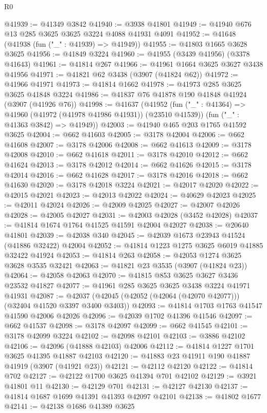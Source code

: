 \begin{lexlean}{R0}
\begin{coremodule}
@41939 := @41349 @3842
@41940 := @3938 @41801
@41949 := @41940 @676 @13 @285 @3625 @3625 @3224 @4088 @41931 @4091
@41952 := @41648 (@41938 (fun ("_" : @41939) => @41949))
@41955 := @41803 @1665 @3628 @3625
@41956 := @41849 @3224
@41960 := @41955 (@3439 @41956) (@3378 @41643)
@41961 := @41814 @267
@41966 := @41961 @1664 @3625 @3627 @3438 @41956
@41971 := @41821 @62 @3438 (@3907 (@41824 @62))
@41972 := @41966 @41971
@41973 := @41814 @1662
@41978 := @41973 @285 @3625 @3625 @41848 @3224
@41986 := @41837 @76 @41878 @190 @41848 @41924 (@3907 (@41926 @76))
@41998 := @41637
    (@41952
      (fun ("_" : @41364) => @41960 (@41972 (@41978 @41986 @41931)) (@23510 @41539))
      (fun ("_" : @41363 @3842) => @41949))
@42003 := @41940 @465 @203 @1765 @41592 @3625
@42004 := @662 @41603
@42005 := @3178 @42004
@42006 := @662 @41608
@42007 := @3178 @42006
@42008 := @662 @41613
@42009 := @3178 @42008
@42010 := @662 @41618
@42011 := @3178 @42010
@42012 := @662 @41624
@42013 := @3178 @42012
@42014 := @662 @41626
@42015 := @3178 @42014
@42016 := @662 @41628
@42017 := @3178 @42016
@42018 := @662 @41630
@42020 := @3178 @42018 @3224
@42021 := @42017 @42020
@42022 := @42015 @42021
@42023 := @42013 @42022
@42024 := @40629 @42023
@42025 := @42011 @42024
@42026 := @42009 @42025
@42027 := @42007 @42026
@42028 := @42005 @42027
@42031 := @42003 @42028 (@3452 @42028)
@42037 := @41814 @1674 @1764 @41525 @41591 @42004 @42027
@42038 := @20640 @41801
@42039 := @42038 @340
@42045 := @42039 @1673 @23943 @41524 (@41886 @32422) @42004
@42052 := @41814 @1223 @1275 @3625 @6019 @41885 @32422 @41924
@42053 := @41814 @263
@42058 := @42053 @1274 @3625 @3628 @3535 @32421
@42063 := @41821 @23 @3535 (@3907 (@41824 @23))
@42064 := @42058 @42063
@42070 := @41815 @853 @3625 @3627 @3436 @23532 @41827
@42077 := @41961 @285 @3625 @3625 @3438 @3224 @41971 @41931
@42087 := @42037 (@42045 (@42052 (@42064 (@42070 @42077))) (@32404 @41520 @3397 @3400 @3403))
@42093 := @41814 @1703 @1763 @41547 @41590 @42006 @42026
@42096 := @42039 @1702 @41396 @41546
@42097 := @662 @41537
@42098 := @3178 @42097
@42099 := @662 @41545
@42101 := @3178 @42099 @3224
@42102 := @42098 @42101
@42103 := @3886 @42102
@42106 := @42096 (@41888 @42103) @42006
@42112 := @41814 @1227 @1701 @3625 @41395 @41887 @42103
@42120 := @41883 @23 @41911 @190 @41887 @41919 (@3907 (@41921 @23))
@42121 := @42112 @42120
@42122 := @41814 @702
@42127 := @42122 @1700 @3625 @41394 @701 @42102
@42129 := @3921 @41801 @11
@42130 := @42129 @701
@42131 := @42127 @42130
@42137 := @41814 @1687 @1699 @41391 @41393 @42097 @42101
@42138 := @41802 @1677
@42141 := @42138 @1686 @41389 @3625

\end{coremodule}
\end{lexlean}
